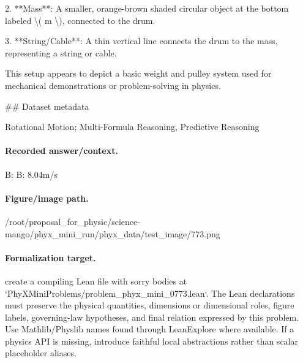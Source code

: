 2. **Mass**: A smaller, orange-brown shaded circular object at the bottom labeled \textbackslash{}( m \textbackslash{}), connected to the drum.

3. **String/Cable**: A thin vertical line connects the drum to the mass, representing a string or cable.

This setup appears to depict a basic weight and pulley system used for mechanical demonstrations or problem-solving in physics.

\#\# Dataset metadata

Rotational Motion; Multi-Formula Reasoning, Predictive Reasoning

\paragraph{Recorded answer/context.}
B: B: 8.04m/s

\paragraph{Figure/image path.}
/root/proposal\_for\_physic/science-mango/phyx\_mini\_run/phyx\_data/test\_image/773.png

\paragraph{Formalization target.}
create a compiling Lean file with sorry bodies at `PhyXMiniProblems/problem\_phyx\_mini\_0773.lean`. The Lean declarations must preserve the physical quantities, dimensions or dimensional roles, figure labels, governing-law hypotheses, and final relation expressed by this problem.
Use Mathlib/Physlib names found through LeanExplore where available. If a physics API is missing, introduce faithful local abstractions rather than scalar placeholder aliases.

